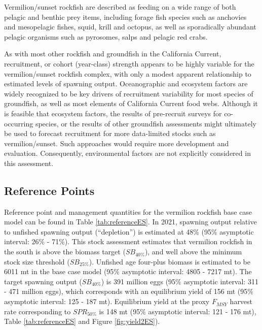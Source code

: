 \documentclass[11pt,
  english,
  a4paper,
]{article}
\begin{document}
Vermilion/sunset rockfish are described as feeding on a wide range of both pelagic and benthic prey items, including forage fish species such as anchovies and mesopelagic fishes, squid, krill and octopus, as well as sporadically abundant pelagic organisms such as pyrosomes, salps and pelagic red crabs.

As with most other rockfish and groundfish in the California Current, recruitment, or cohort (year-class) strength appears to be highly variable for the vermilion/sunset rockfish complex, with only a modest apparent relationship to estimated levels of spawning output. Oceanographic and ecosystem factors are widely recognized to be key drivers of recruitment variability for most species of groundfish, as well as most elements of California Current food webs. Although it is feasible that ecosystem factors, the results of pre-recruit surveys for co-occurring species, or the results of other groundfish assessments might ultimately be used to forecast recruitment for more data-limited stocks such as vermilion/sunset. Such approaches would require more development and evaluation. Consequently, environmental factors are not explicitly considered in this assessment.

\FloatBarrier


\hypertarget{reference-points}{%
\subsection*{Reference Points}\label{reference-points}}

\leavevmode\tagmcend\tagstructend

Reference point and management quantities for the vermilion rockfish base case model can be found in Table \ref{tab:referenceES}. In 2021, spawning output relative to unfished spawning output (``depletion'') is estimated at 48\% (95\% asymptotic interval: 26\% - 71\%). This stock assessment estimates that vermilion rockfish in the south is above the biomass target ({\(SB_{40\%}\)\leavevmode\tagmcend\tagstructend}), and well above the minimum stock size threshold ({\(SB_{25\%}\)\leavevmode\tagmcend\tagstructend}). Unfished age four-plus biomass is estimated to be 6011 mt in the base case model (95\% asymptotic interval: 4805 - 7217 mt). The target spawning output ({\(SB_{40\%}\)\leavevmode\tagmcend\tagstructend}) is 391 million eggs (95\% asymptotic interval: 311 - 471 million eggs), which corresponds with an equilibrium yield of 156 mt (95\% asymptotic interval: 125 - 187 mt). Equilibrium yield at the proxy {\(F_{MSY}\)\leavevmode\tagmcend\tagstructend} harvest rate corresponding to {\(SPR_{50\%}\)\leavevmode\tagmcend\tagstructend} is 148 mt (95\% asymptotic interval: 121 - 176 mt), Table \ref{tab:referenceES} and Figure \ref{fig:yield2ES}).
\end{document}
